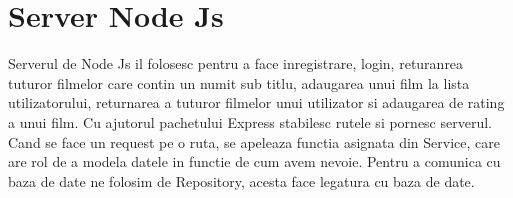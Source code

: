 \section{Server Node Js}
\label{sec:ch5sec1}

\par Serverul de Node Js il folosesc pentru a face inregistrare, login, returanrea tuturor filmelor care contin un numit sub titlu, adaugarea unui film la lista utilizatorului, returnarea a tuturor filmelor unui utilizator si adaugarea de rating a unui film. Cu ajutorul pachetului Express stabilesc rutele si pornesc serverul. Cand se face un request pe o ruta, se apeleaza functia asignata din Service, care are rol de a modela datele in functie de cum avem nevoie. Pentru a comunica cu baza de date ne folosim de Repository, acesta face legatura cu baza de date.


